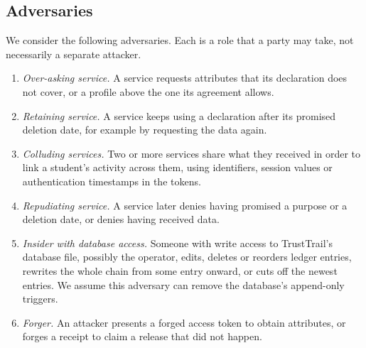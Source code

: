 \subsection{Adversaries}
We consider the following adversaries. Each is a role that a party may take, not necessarily a separate attacker.

\begin{enumerate}
\item[\textbf{A1}] \emph{Over-asking service.} A service requests attributes that its declaration does not cover, or a profile above the one its agreement allows.
\item[\textbf{A2}] \emph{Retaining service.} A service keeps using a declaration after its promised deletion date, for example by requesting the data again.
\item[\textbf{A3}] \emph{Colluding services.} Two or more services share what they received in order to link a student's activity across them, using identifiers, session values or authentication timestamps in the tokens.
\item[\textbf{A4}] \emph{Repudiating service.} A service later denies having promised a purpose or a deletion date, or denies having received data.
\item[\textbf{A5}] \emph{Insider with database access.} Someone with write access to TrustTrail's database file, possibly the operator, edits, deletes or reorders ledger entries, rewrites the whole chain from some entry onward, or cuts off the newest entries. We assume this adversary can remove the database's append-only triggers.
\item[\textbf{A6}] \emph{Forger.} An attacker presents a forged access token to obtain attributes, or forges a receipt to claim a release that did not happen.
\end{enumerate}

